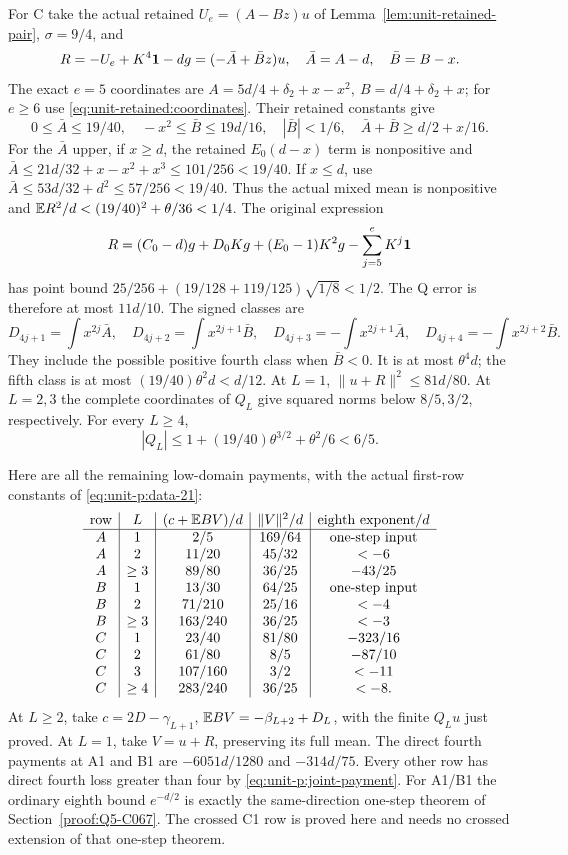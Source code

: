 For C take the actual retained \(U_e=(A-Bz)u\) of
Lemma~\ref{lem:unit-retained-pair}, \(\sigma=9/4\), and
\[
 R=-U_e+K^4\mathbf1-dg=(-\bar A+\bar Bz)u,\quad
 \bar A=A-d,\quad\bar B=B-x .
\]
The exact \(e=5\) coordinates are
\(A=5d/4+\delta_2+x-x^2,\ B=d/4+\delta_2+x\);
for \(e\ge6\) use \eqref{eq:unit-retained:coordinates}.
Their retained constants give
\[
 0\le\bar A\le19/40,\quad
 -x^2\le\bar B\le19d/16,\quad|\bar B|<1/6,\quad
 \bar A+\bar B\ge d/2+x/16 .
\]
For the \(\bar A\) upper, if \(x\ge d\), the retained
\(E_0(d-x)\) term is nonpositive and
\(\bar A\le21d/32+x-x^2+x^3\le101/256<19/40\).
If \(x\le d\), use
\(\bar A\le53d/32+d^2\le57/256<19/40\).
Thus the actual mixed mean is nonpositive and
\(\mathbb E R^2/d<(19/40)^2+\theta/36<1/4\).
The original expression
\[
 R=(C_0-d)g+D_0Kg+(E_0-1)K^2g-\sum_{j=5}^eK^j\mathbf1
\]
has point bound
\(25/256+(19/128+119/125)\sqrt{1/8}<1/2\).
The Q error is therefore at most \(11d/10\).
The signed classes are
\[
 D_{4j+1}=\int x^{2j}\bar A,\quad
 D_{4j+2}=\int x^{2j+1}\bar B,\quad
 D_{4j+3}=-\int x^{2j+1}\bar A,\quad
 D_{4j+4}=-\int x^{2j+2}\bar B .
\]
They include the possible positive fourth class when \(\bar B<0\).
It is at most \(\theta^4d\); the fifth class is at most
\((19/40)\theta^2d<d/12\).
At \(L=1\), \(\|u+R\|^2\le81d/80\).
At \(L=2,3\) the complete coordinates of \(Q_L\) give
squared norms below \(8/5,3/2\), respectively.
For every \(L\ge4\),
\[
 |Q_L|\le1+(19/40)\theta^{3/2}+\theta^2/6<6/5 .
\]

Here are all the remaining low-domain payments, with the actual
first-row constants of \eqref{eq:unit-p:data-21}:
\begin{equation}\label{eq:unit-p:data-22}
\begin{array}{c|c|c|c|c}
 \text{row}&L&(c+\mathbb E BV)/d&\|V\|^2/d&
                      \text{eighth exponent}/d\\\hline
 A&1&2/5&169/64&\text{one-step input}\\
 A&2&11/20&45/32&<-6\\
 A&\ge3&89/80&36/25&-43/25\\
 B&1&13/30&64/25&\text{one-step input}\\
 B&2&71/210&25/16&<-4\\
 B&\ge3&163/240&36/25&<-3\\
 C&1&23/40&81/80&-323/16\\
 C&2&61/80&8/5&-87/10\\
 C&3&107/160&3/2&<-11\\
 C&\ge4&283/240&36/25&<-8 .
\end{array}
\end{equation}
At \(L\ge2\), take
\(c=2D-\gamma_{L+1}\),
\(\mathbb E BV=-\beta_{L+2}+D_L\), with the finite \(Q_Lu\) just proved.
At \(L=1\), take \(V=u+R\), preserving its full mean.
The direct fourth payments at A1 and B1 are
\(-6051d/1280\) and \(-314d/75\).
Every other row has direct fourth loss greater than four by
\eqref{eq:unit-p:joint-payment}.
For A1/B1 the ordinary eighth bound \(e^{-d/2}\) is exactly the
same-direction one-step theorem of Section~\ref{proof:Q5-C067}.
The crossed C1 row is proved here and needs no crossed extension
of that one-step theorem.

